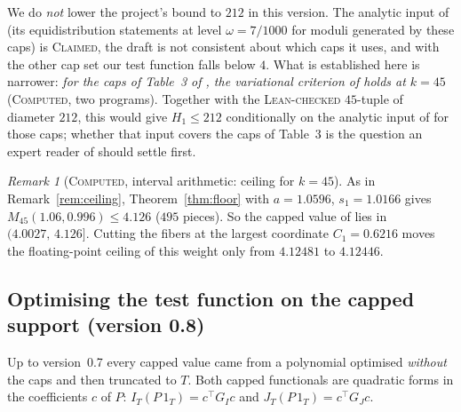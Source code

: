 \documentclass[11pt]{amsart}
\theoremstyle{definition}
\theoremstyle{remark}
\newtheorem{remark}[theorem]{Remark}
\newcommand{\lbl}[1]{\textup{\textsc{#1}}}
\begin{document}
We do \emph{not} lower the project's bound to $212$ in this version. The
analytic input of \cite{Cha26} (its equidistribution statements at level
$\omega=7/1000$ for moduli generated by these caps) is \lbl{Claimed}, the
draft is not consistent about which caps it uses, and with the other cap set
our test function falls below $4$. What is established here is narrower:
\emph{for the caps of Table~3 of \cite{Cha26}, the variational criterion of
\cite[Thm.~4.10]{Cha26} holds at $k=45$} (\lbl{Computed}, two programs).
Together with the \lbl{Lean-checked} $45$-tuple of diameter $212$, this
would give $H_1\le212$ conditionally on the analytic input of \cite{Cha26}
for those caps; whether that input covers the caps of Table~3 is the question
an expert reader of \cite{Cha26} should settle first.

\begin{remark}[\lbl{Computed}, interval arithmetic: ceiling for $k=45$]\label{rem:ceiling45}
As in Remark~\ref{rem:ceiling}, Theorem~\ref{thm:floor} with $a=1.0596$,
$s_1=1.0166$ gives $M_{45}(1.06,0.996)\le4.126$ ($495$ pieces). So the
capped value of \cite{Cha26} lies in $(4.0027,\,4.126]$. Cutting the fibers at
the largest coordinate $C_1=0.6216$ moves the floating-point ceiling of this
weight only from $4.12481$ to $4.12446$.
\end{remark}

\subsection*{Optimising the test function on the capped support (version 0.8)}
Up to version~0.7 every capped value came from a polynomial optimised
\emph{without} the caps and then truncated to $T$. Both capped functionals
are quadratic forms in the coefficients $c$ of $P$:
$I_T(P\,1_T)=c^{\top}G_Ic$ and $J_T(P\,1_T)=c^{\top}G_Jc$.
\end{document}
